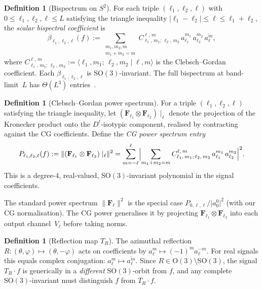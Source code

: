 \documentclass[11pt]{article}
\theoremstyle{plain}
\theoremstyle{definition}
\newtheorem{definition}[theorem]{Definition}
\theoremstyle{remark}
\newcommand{\SO}{\mathrm{SO}}
\newcommand{\OG}{\mathrm{O}}
\newcommand{\CG}[6]{C^{#5,\,#6}_{#1,\,#2;\,#3,\,#4}}
\newcommand{\abs}[1]{\lvert #1 \rvert}
\newcommand{\norm}[1]{\lVert #1 \rVert}
\newcommand{\conj}[1]{\overline{#1}}
\begin{document}
\begin{definition}[Bispectrum on $S^2$]\label{def:bispectrum}
For each triple $(\ell_1,\ell_2,\ell)$ with $0 \le \ell_1,\ell_2,\ell \le L$
satisfying the triangle inequality $\abs{\ell_1{-}\ell_2} \le \ell \le \ell_1{+}\ell_2$,
the \emph{scalar bispectral coefficient} is
\begin{equation}\label{eq:bispectrum}
  \beta_{\ell_1,\ell_2,\ell}(f)
  := \sum_{\substack{m_1,m_2,m \\ m_1+m_2 = m}}
     \CG{\ell_1}{m_1}{\ell_2}{m_2}{\ell}{m} \,
     a_{\ell_1}^{m_1}\, a_{\ell_2}^{m_2}\, \conj{a_\ell^m},
\end{equation}
where $\CG{\ell_1}{m_1}{\ell_2}{m_2}{\ell}{m} := \langle \ell_1, m_1;\, \ell_2, m_2 \mid \ell, m\rangle$
is the Clebsch--Gordan coefficient. Each $\beta_{\ell_1,\ell_2,\ell}$
is $\SO(3)$-invariant. The full bispectrum at band-limit~$L$ has
$\Theta(L^3)$ entries~\citep{kakarala1992triple,kakarala2012bispectrum}.
\end{definition}

\begin{definition}[Clebsch--Gordan power spectrum]\label{def:cg-power}
For a triple $(\ell_1,\ell_2,\ell)$ satisfying the triangle inequality,
let $(\mathbf{F}_{\ell_1}\otimes\mathbf{F}_{\ell_2})\mid_\ell$ denote the
projection of the Kronecker product onto the $D^\ell$-isotypic component,
realised by contracting against the CG coefficients. Define the
\emph{CG power spectrum entry}
\begin{equation}\label{eq:cg-power}
  P_{\ell_1,\ell_2,\ell}(f)
  := \norm{(\mathbf{F}_{\ell_1}\otimes\mathbf{F}_{\ell_2})\mid_\ell}^2
   = \sum_{m=-\ell}^{\ell}
     \Bigl| \sum_{m_1+m_2=m}
       \CG{\ell_1}{m_1}{\ell_2}{m_2}{\ell}{m}\,
       a_{\ell_1}^{m_1}\, a_{\ell_2}^{m_2} \Bigr|^2.
\end{equation}
This is a degree-$4$, real-valued, $\SO(3)$-invariant polynomial in
the signal coefficients.
\end{definition}

\noindent
The standard power spectrum $\norm{\mathbf{F}_\ell}^2$ is the special
case $P_{0,\ell,\ell}/\abs{a_0^0}^2$ (with our CG normalisation). The
CG power generalises it by projecting
$\mathbf{F}_{\ell_1}\otimes\mathbf{F}_{\ell_2}$ into each output
channel~$V_\ell$ before taking norms.

\begin{definition}[Reflection map $T_R$]\label{def:TR}
The azimuthal reflection $R:(\theta,\varphi)\mapsto(\theta,-\varphi)$ acts
on coefficients by $a_\ell^m\mapsto(-1)^m a_\ell^{-m}$. For real signals
this equals complex conjugation: $a_\ell^m\mapsto\conj{a_\ell^m}$. Since
$R\in\OG(3)\setminus\SO(3)$, the signal $T_R\cdot f$ is generically in a
\emph{different} $\SO(3)$-orbit from $f$, and any complete
$\SO(3)$-invariant must distinguish $f$ from $T_R\cdot f$.
\end{definition}
\end{document}
